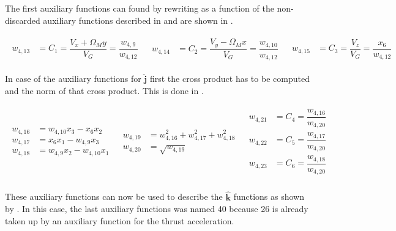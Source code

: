 The first auxiliary functions can found by rewriting  as a function of the non-discarded auxiliary functions described in  and are shown in .

\begin{align} \label{eq:iHatAuxF}
\begin{split}
w_{4,13} &= C_{1} = \dfrac{V_{x}+\Omega_{M}y}{V_{G}} = \dfrac{w_{4,9}}{w_{4,12}}
\end{split}
&
\begin{split}
w_{4,14} &= C_{2} = \dfrac{V_{y}-\Omega_{M}x}{V_{G}} = \dfrac{w_{4,10}}{w_{4,12}}
\end{split}
&
\begin{split}
w_{4,15} &= C_{3} = \dfrac{V_{z}}{V_{G}} = \dfrac{x_{6}}{w_{4,12}}
\end{split}
\end{align}

In case of the auxiliary functions for $\mathbf{\hat{j}}$ first the cross product has to be computed and the norm of that cross product. This is done in .

\begin{align} \label{eq:jHatAuxF}
\begin{split}
w_{4,16} &= w_{4,10}x_{3}-x_{6}x_{2}\\
w_{4,17} &= x_{6}x_{1}-w_{4,9}x_{3}\\
w_{4,18} &= w_{4,9}x_{2}-w_{4,10}x_{1} \\
\end{split}
&
\begin{split}
w_{4,19} &= w_{4,16}^{2}+w_{4,17}^{2}+w_{4,18}^{2} \\
w_{4,20} &= \sqrt{w_{4,19}} \\
\end{split}
&
\begin{split}
w_{4,21} &= C_{4} = \dfrac{w_{4,16}}{w_{4,20}} \\
w_{4,22} &= C_{5} = \dfrac{w_{4,17}}{w_{4,20}} \\
w_{4,23} &= C_{6} = \dfrac{w_{4,18}}{w_{4,20}} \\
\end{split}
\end{align}


These auxiliary functions can now be used to describe the $\mathbf{\hat{k}}$ functions as shown by . In this case, the last auxiliary functions was named 40 because 26 is already taken up by an auxiliary function for the thrust acceleration.

